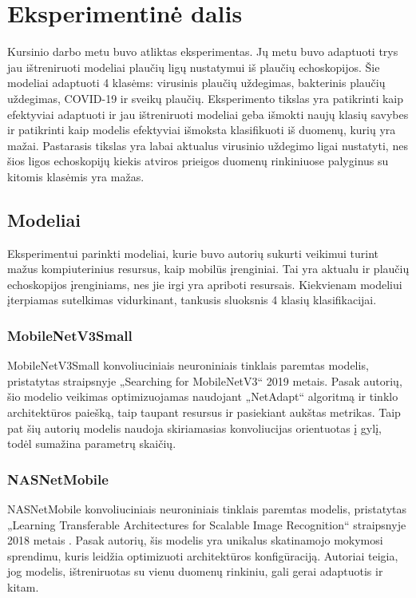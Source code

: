 \documentclass[fleqn]{VUMIFKompMagistrinis}
\begin{document}
\section{Eksperimentinė dalis}
Kursinio darbo metu buvo atliktas eksperimentas. Jų metu buvo adaptuoti trys jau ištreniruoti modeliai plaučių ligų nustatymui iš plaučių echoskopijos. Šie modeliai adaptuoti 4 klasėms: virusinis plaučių uždegimas, bakterinis plaučių uždegimas, COVID-19 ir sveikų plaučių. Eksperimento tikslas yra patikrinti kaip efektyviai adaptuoti ir jau ištreniruoti modeliai geba išmokti naujų klasių savybes ir patikrinti kaip modelis efektyviai išmoksta klasifikuoti iš duomenų, kurių yra mažai. Pastarasis tikslas yra labai aktualus virusinio uždegimo ligai nustatyti, nes šios ligos echoskopijų kiekis atviros prieigos duomenų rinkiniuose palyginus su kitomis klasėmis yra mažas.
\subsection{Modeliai}
Eksperimentui parinkti modeliai, kurie buvo autorių sukurti veikimui turint mažus kompiuterinius resursus, kaip mobilūs įrenginiai. Tai yra aktualu ir plaučių echoskopijos įrenginiams, nes jie irgi yra apriboti resursais. Kiekvienam modeliui įterpiamas sutelkimas vidurkinant, tankusis sluoksnis 4 klasių klasifikacijai.
\subsubsection{MobileNetV3Small}
MobileNetV3Small konvoliuciniais neuroniniais tinklais paremtas modelis, pristatytas straipsnyje „Searching for MobileNetV3“ \cite{mobilenet} 2019 metais. Pasak autorių, šio modelio veikimas optimizuojamas naudojant „NetAdapt“ algoritmą ir tinklo architektūros paiešką, taip taupant resursus ir pasiekiant aukštas metrikas. Taip pat šių autorių modelis naudoja skiriamasias konvoliucijas orientuotas į gylį, todėl sumažina parametrų skaičių.
\subsubsection{NASNetMobile}
NASNetMobile konvoliuciniais neuroniniais tinklais paremtas modelis, pristatytas „Learning Transferable Architectures for Scalable Image Recognition“ straipsnyje 2018 metais \cite{nasnet}. Pasak autorių, šis modelis yra unikalus skatinamojo mokymosi sprendimu, kuris leidžia optimizuoti architektūros konfigūraciją. Autoriai teigia, jog modelis, ištreniruotas su vienu duomenų rinkiniu, gali gerai adaptuotis ir kitam. 
\end{document}
